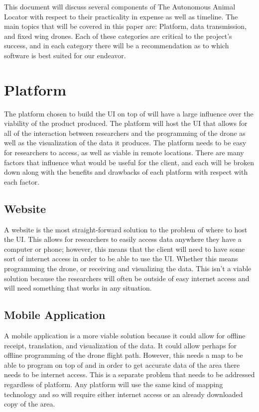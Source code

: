 \documentclass[onecolumn, draftclsnofoot,10pt, compsoc]{IEEEtran}
\begin{document}
This document will discuss several components of The Autonomous Animal Locator with respect to their practicality in expense as well as timeline. The main topics that will be covered in this paper are: Platform, data transmission, and fixed wing drones. Each of these categories are critical to the project's success, and in each category there will be a recommendation as to which software is best suited for our endeavor.

\section{Platform}

The platform chosen to build the UI on top of will have a large influence over the viability of the product produced. The platform will host the UI that allows for all of the interaction between researchers and the programming of the drone as well as the visualization of the data it produces. The platform needs to be easy for researchers to access, as well as viable in remote locations. There are many factors that influence what would be useful for the client, and each will be broken down along with the benefits and drawbacks of each platform with respect with each factor.

\subsection{Website}

A website is the most straight-forward solution to the problem of where to host the UI. This allows for researchers to easily access data anywhere they have a computer or phone; however, this means that the client will need to have some sort of internet access in order to be able to use the UI. Whether this means programming the drone, or receiving and visualizing the data. This isn't a viable solution because the researchers will often be outside of easy internet access and will need something that works in any situation.

\subsection{Mobile Application}

A mobile application is a more viable solution because it could allow for offline receipt, translation, and visualization of the data. It could allow perhaps for offline programming of the drone flight path. However, this needs a map to be able to program on top of and in order to get accurate data of the area there needs to be internet access. This is a separate problem that needs to be addressed regardless of platform. Any platform will use the same kind of mapping technology and so will require either internet access or an already downloaded copy of the area.
\end{document}
